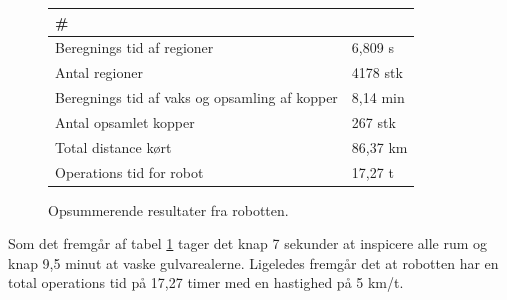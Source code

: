 \begin{figure}[th!]
\centering
\begin{tabular}{l|l}
\# & \\\hline
Beregnings tid af regioner & 6,809 s \\
Antal regioner & 4178 stk\\
Beregnings tid af vaks og opsamling af kopper & 8,14 min \\
Antal opsamlet kopper & 267 stk\\
Total distance kørt & 86,37 km\\
Operations tid for robot & 17,27 t
\end{tabular}
\captionsetup{type=table}
\caption[tekst i indholdsfortegnelsen]{Opsummerende resultater fra robotten.}
\label{tb:resultater}
\end{figure}
Som det fremgår af tabel \ref{tb:resultater} tager det knap 7 sekunder at inspicere alle rum og knap 9,5 minut at vaske gulvarealerne. Ligeledes fremgår det at robotten har en total operations tid på 17,27 timer med en hastighed på 5 km/t. 







